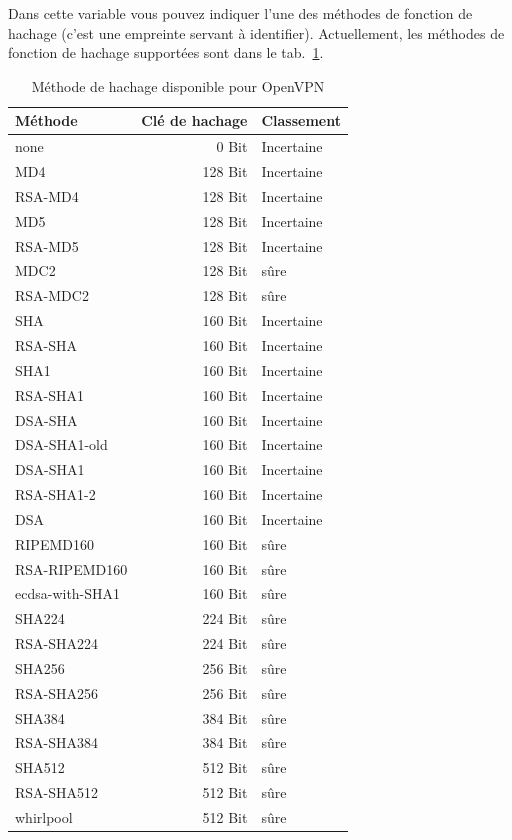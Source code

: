 \begin{description}
  Dans cette variable vous pouvez indiquer l'une des méthodes de fonction de hachage
  (c'est une empreinte servant à identifier). Actuellement, les méthodes de fonction
  de hachage supportées sont dans le tab.~\ref{openvpn:digests}.

  \begin{table}[!ht]
    \centering
    \caption{Méthode de hachage disponible pour OpenVPN}
    \label{openvpn:digests}
    \begin{tabular}{|p{4cm}|r|l|}
      \hline
      Méthode & Clé de hachage & Classement \\
      \hline
      none             &   0 Bit & Incertaine \\
      MD4              & 128 Bit & Incertaine \\
      RSA-MD4          & 128 Bit & Incertaine \\
      MD5              & 128 Bit & Incertaine \\
      RSA-MD5          & 128 Bit & Incertaine \\
      MDC2             & 128 Bit & sûre \\
      RSA-MDC2         & 128 Bit & sûre \\
      SHA              & 160 Bit & Incertaine \\
      RSA-SHA          & 160 Bit & Incertaine \\
      SHA1             & 160 Bit & Incertaine \\
      RSA-SHA1         & 160 Bit & Incertaine \\
      DSA-SHA          & 160 Bit & Incertaine \\
      DSA-SHA1-old     & 160 Bit & Incertaine \\
      DSA-SHA1         & 160 Bit & Incertaine \\
      RSA-SHA1-2       & 160 Bit & Incertaine \\
      DSA              & 160 Bit & Incertaine \\
      RIPEMD160        & 160 Bit & sûre \\
      RSA-RIPEMD160    & 160 Bit & sûre \\
      ecdsa-with-SHA1  & 160 Bit & sûre \\
      SHA224           & 224 Bit & sûre \\
      RSA-SHA224       & 224 Bit & sûre \\
      SHA256           & 256 Bit & sûre \\
      RSA-SHA256       & 256 Bit & sûre \\
      SHA384           & 384 Bit & sûre \\
      RSA-SHA384       & 384 Bit & sûre \\
      SHA512           & 512 Bit & sûre \\
      RSA-SHA512       & 512 Bit & sûre \\
      whirlpool        & 512 Bit & sûre \\
      \hline
    \end{tabular}
  \end{table}


\end{description}
